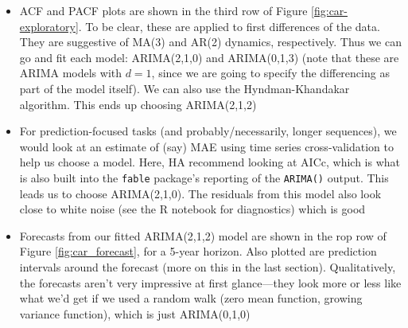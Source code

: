\documentclass{article}
\begin{document}
\begin{itemize}
\item ACF and PACF plots are shown in the third row of Figure
  \ref{fig:car-exploratory}. To be clear, these are applied to first differences
  of the data. They are suggestive of MA(3) and AR(2) dynamics,
  respectively. Thus we can go and fit each model: ARIMA(2,1,0) and ARIMA(0,1,3)
  (note that these are ARIMA models with $d=1$, since we are going to specify
  the differencing as part of the model itself). We can also use the
  Hyndman-Khandakar algorithm. This ends up choosing ARIMA(2,1,2)   

\item For prediction-focused tasks (and probably/necessarily, longer sequences),
  we would look at an estimate of (say) MAE using time series cross-validation
  to help us choose a model. Here, HA recommend looking at AICc, which is what
  is also built into the \verb|fable| package's reporting of the \verb|ARIMA()| 
  output. This leads us to choose ARIMA(2,1,0). The residuals from this model
  also look close to white noise (see the R notebook for diagnostics) which is
  good  

\item Forecasts from our fitted ARIMA(2,1,2) model are shown in the rop row of
  Figure \ref{fig:car_forecast}, for a 5-year horizon. Also plotted are
  prediction intervals around the forecast (more on this in the last 
  section). Qualitatively, the forecasts aren't very impressive at first
  glance---they look more or less like what we'd get if we used a random walk
  (zero mean function, growing variance function), which is just ARIMA(0,1,0)   


\end{itemize}
\end{document}

